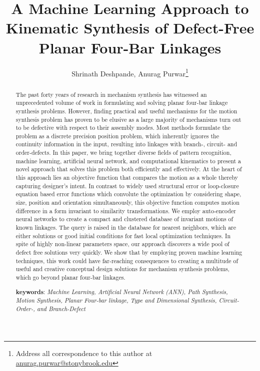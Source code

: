 \documentclass[twocolumn,10pt]{asme2ej}
\title{A Machine Learning Approach to Kinematic Synthesis of Defect-Free Planar Four-Bar Linkages}
\author{Shrinath Deshpande,
	{\tensfb Anurag Purwar\thanks{Address all correspondence to this author at \href{anurag.purwar@stonybrook.edu}{anurag.purwar@stonybrook.edu}}}
    \affiliation{
	Computer-Aided Design and Innovation Lab\\
	Department of Mechanical Engineering\\
	Stony Brook University\\
	Stony Brook, New York, 11794-2300
    }
}
\begin{document}
\maketitle

\begin{abstract}
The past forty years of research in mechanism synthesis has witnessed an unprecedented volume of work in formulating and solving planar four-bar linkage synthesis problems.
However, finding practical and useful mechanisms for the motion synthesis problem has proven to be elusive as a large majority of mechanisms turn out to be defective with respect to their assembly modes.
Most methods formulate the problem as a discrete precision position problem, which inherently ignores the continuity information in the input, resulting into linkages with branch-, circuit- and order-defects.
In this paper, we bring together diverse fields of pattern recognition, machine learning, artificial neural network, and computational kinematics to present a novel approach that solves this problem both efficiently and effectively.
At the heart of this approach lies an objective function that compares the motion as a whole thereby capturing designer's intent.
In contrast to widely used structural error or loop-closure equation based error functions which convolute the optimization by considering shape, size, position and orientation simultaneously, this objective function computes motion difference in a form invariant to similarity transformations.
We employ auto-encoder neural networks to create a compact and clustered database of invariant motions of known linkages.
The query is raised in the database for nearest neighbors, which are either solutions or good initial conditions for fast local optimization techniques.
In spite of highly non-linear parameters space, our approach discovers a wide pool of defect free solutions very quickly.
We show that by employing proven machine learning techniques, this work could have far-reaching consequences to creating a multitude of useful and creative conceptual design solutions for mechanism synthesis problems, which go beyond planar four-bar linkages.

\textbf{keywords}: \emph{Machine Learning, Artificial Neural Network (ANN), Path Synthesis, Motion Synthesis, Planar Four-bar linkage, Type and Dimensional Synthesis, Circuit- Order-, and Branch-Defect}

\end{abstract}
\end{document}
